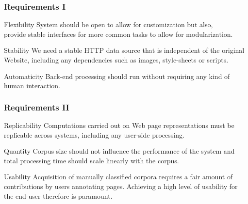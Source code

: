 \documentclass{beamer}
\begin{document}
        \begin{frame}
            \frametitle{Requirements I}
            \begin{block}{Flexibility}
                System should be open to allow for customization but also, \\
                provide stable interfaces for more common tasks to allow for modularization.
            \end{block}

\pause

            \begin{block}{Stability}
                We need a stable HTTP data source that is independent of the original Website, including any dependencies such as images, style-sheets or scripts.
            \end{block}

\pause

            \begin{block}{Automaticity}
                Back-end processing should run without requiring any kind of human interaction.
            \end{block}
        \end{frame}

        \begin{frame}
            \frametitle{Requirements II}
            \begin{block}{Replicability}
                Computations carried out on Web page representations must be replicable across systems, including any user-side processing.
            \end{block}

\pause

            \begin{block}{Quantity}
                Corpus size should not influence the performance of the system and total processing time should scale linearly with the corpus.
            \end{block}

\pause

            \begin{block}{Usability}
                Acquisition of manually classified corpora requires a fair amount of contributions by users annotating pages.
                Achieving a high level of usability for the end-user therefore is paramount.
            \end{block}
        \end{frame}
\end{document}
